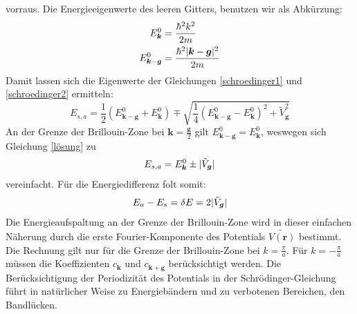\documentclass[11pt]{article}
\DeclarePairedDelimiter\abs{\lvert}{\rvert}
\begin{document}
vorraus. Die Energieeigenwerte des leeren Gitters, benutzen wir als Abkürzung:
\begin{equation}
  \begin{align}
    E_{\bm{k}}^0&=\frac{\hbar^2k^2}{2m}\\
    E_{\bm{k}-\bm{g}}^0&=\frac{\hbar^2\abs{\bm{k}-\bm{g}}^2}{2m}
  \end{align}
\end{equation}
Damit lassen sich die Eigenwerte der Gleichungen \ref{schroedinger1} und
\ref{schroedinger2} ermitteln:
\begin{equation}\label{lösung}
  E_{s,a}=\frac{1}{2}(E_{\bm{k}-\bm{g}}^0+E_{\bm{k}}^0)\mp\sqrt{\frac{1}{4}
  (E_{\bm{k}-\bm{g}}^0-E_{\bm{k}}^0)^2+\tilde{V}_{\bm{g}}^2}
\end{equation}
An der Grenze der Brillouin-Zone bei $\bm{k}=\frac{\bm{g}}{2}$ gilt
$E_{\bm{k}-\bm{g}}^0=E_{\bm{k}}^0$, weswegen sich Gleichung \ref{lösung} zu
\begin{equation}
  E_{s,a}=E_{\bm{k}}^0\pm\abs{\tilde{V}_{\bm{g}}}
\end{equation}
vereinfacht. Für die Energiedifferenz folt somit:
\begin{equation}
  E_a-E_s=\delta E=2\abs{\tilde{V}_{\bm{g}}}
\end{equation}
Die Energieaufspaltung an der Grenze der Brillouin-Zone wird in dieser einfachen
Näherung durch die erste Fourier-Komponente des Potentials $\tilde{V(\bm{r})}$
bestimmt. Die Rechnung gilt nur für die Grenze der Brillouin-Zone bei
$k=\frac{\pi}{a}$. Für $k=-\frac{\pi}{a}$ müssen die Koeffizienten $c_{\bm{k}}$
und $c_{\bm{k}+\bm{g}}$ berücksichtigt werden. Die Berücksichtigung der
Periodizität des Potentials in der Schrödinger-Gleichung führt in natürlicher
Weise zu Energiebändern und zu verbotenen Bereichen, den Bandlücken.
\end{document}
